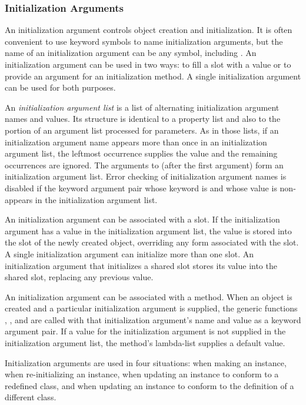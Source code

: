 \subsubsection{Initialization Arguments}

An initialization argument controls object creation and
initialization.  It is often convenient to use keyword symbols to name
initialization arguments, but the name of an initialization argument
can be any symbol, including .  An initialization argument
can be used in two ways: to fill a slot with a value or to provide an
argument for an initialization method.  A single initialization
argument can be used for both purposes.

An \emph{initialization argument list} is a list of alternating
initialization argument names and values.  Its structure is identical
to a property list and also to the portion of an argument list
processed for  parameters.  As in those lists, if an
initialization argument name appears more than once in an
initialization argument list, the leftmost occurrence supplies the
value and the remaining occurrences are ignored.  The arguments to
 (after the first argument) form an initialization
argument list.  Error checking of initialization argument names is
disabled if the keyword argument pair whose keyword is 
 and whose value is non- appears in the
initialization argument list.

An initialization argument can be associated with a slot.  If the
initialization argument has a value in the initialization argument
list, the value is stored into the slot of the newly created object,
overriding any  form associated with the slot.  A
single initialization argument can initialize more than one slot.  An
initialization argument that initializes a shared slot stores its
value into the shared slot, replacing any previous value.

An initialization argument can be associated with a method.  When an
object is created and a particular initialization argument is
supplied, the generic functions , 
, and  are called with that
initialization argument's name and value as a keyword argument pair.
If a value for the initialization argument is not supplied in the
initialization argument list, the method's lambda-list supplies a
default value.

Initialization arguments are used in four situations: when making an
instance, when re-initializing an instance, when updating an instance to
conform to a redefined class, and when updating an instance to conform
to the definition of a different class.

